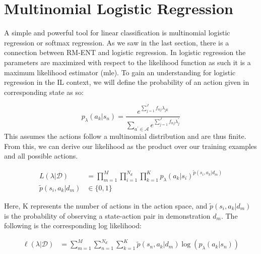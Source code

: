 \documentclass[11pt]{article}
\newcommand{\data}{\mathcal{D}}
\begin{document}
\section{Multinomial Logistic Regression}

\quad A simple and powerful tool for linear classification is multinomial logistic regression or softmax regression. As we saw in the last section, there is a connection between RM-ENT and logistic regression. In logistic regression the parameters are maximized with respect to the likelihood function as such it is a maximum likelihood estimator (mle). To gain an understanding for logistic regression in the IL context, we will define the probability of an action given in corresponding state as so:

\begin{equation} \label{softmax}
     p_{\lambda}(a_{k}|s_{n}) = \frac{e^{\sum_{j=1}^{J} f_{nj} \lambda_{jk}}}{\sum_{a^{\prime} \in \mathcal{A}} e^{\sum_{j=1}^{J} f_{nj} \lambda^{\prime}_{j}}}
\end{equation}
\quad This assumes the actions follow a multinomial distribution and are thus finite. From this, we can derive our likelihood as the product over our training examples and all possible actions.

\begin{equation} \label{orig_likelihood}
    \begin{aligned}
       L(\lambda | \data) &=  \prod_{m=1}^{M}\prod_{i=1}^{N_{d}} \prod_{k=1}^{K}  p_{\lambda}(a_{k}|s_{i})^{\widetilde{p}(s_{i}, a_{k}| d_{m})} \\
        \widetilde{p}(s_{i}, a_{k}|d_{m}) &\in \{0,1\} 
    \end{aligned}
\end{equation}

\quad Here, K represents the number of actions in the action space, and $\widetilde{p}(s_{i}, a_{k}|d_{m})$ is the probability of observing a state-action pair in demonstration $d_{m}$. The following is the corresponding log likelihood:

\begin{equation} \label{orig_log_likelihood}
    \begin{aligned}
       \ell(\lambda | \data) &=  \sum_{m=1}^{M}\sum_{n=1}^{N_{d}} \sum_{k=1}^{K}  \widetilde{p}(s_{n}, a_{k}| d_{m}) \log(p_{\lambda}(a_{k}|s_{n})) 
    \end{aligned}
\end{equation}
\end{document}
